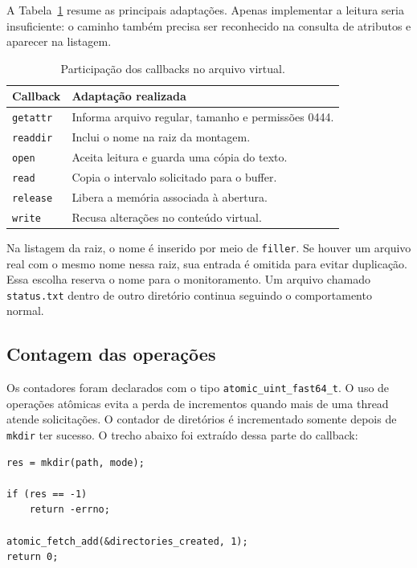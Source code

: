 \documentclass[12pt]{article}
\begin{document}
A Tabela~\ref{tab:callbacks} resume as principais adaptações. Apenas
implementar a leitura seria insuficiente: o caminho também precisa
ser reconhecido na consulta de atributos e aparecer na listagem.

\begin{table}[ht]
\centering
\caption{Participação dos callbacks no arquivo virtual.}
\label{tab:callbacks}
\begin{tabular}{p{}p{}}
\hline
Callback & Adaptação realizada \\
\hline
\texttt{getattr} & Informa arquivo regular, tamanho e permissões 0444. \\
\texttt{readdir} & Inclui o nome na raiz da montagem. \\
\texttt{open} & Aceita leitura e guarda uma cópia do texto. \\
\texttt{read} & Copia o intervalo solicitado para o buffer. \\
\texttt{release} & Libera a memória associada à abertura. \\
\texttt{write} & Recusa alterações no conteúdo virtual. \\
\hline
\end{tabular}
\end{table}

Na listagem da raiz, o nome é inserido por meio de \texttt{filler}.
Se houver um arquivo real com o mesmo nome nessa raiz, sua entrada
é omitida para evitar duplicação. Essa escolha reserva o nome para o
monitoramento. Um arquivo chamado \texttt{status.txt} dentro de outro
diretório continua seguindo o comportamento normal.

\subsection{Contagem das operações}

Os contadores foram declarados com o tipo
\texttt{atomic\_uint\_fast64\_t}. O uso de operações atômicas evita a
perda de incrementos quando mais de uma thread atende solicitações.
O contador de diretórios é incrementado somente depois de
\texttt{mkdir} ter sucesso. O trecho abaixo foi extraído dessa parte
do callback:

\begin{lstlisting}
res = mkdir(path, mode);

if (res == -1)
    return -errno;

atomic_fetch_add(&directories_created, 1);
return 0;
\end{lstlisting}
\end{document}
